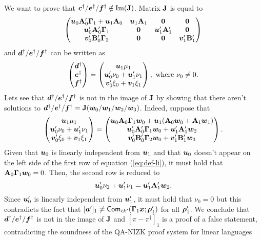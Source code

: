 We want to prove that ${\boldsymbol{c}}^\dag/{\boldsymbol{e}}^\dag/{\boldsymbol{f}}^\dag\notin\mathrm{Im}(\mathbf{{J}})$. Matrix $\mathbf{{J}}$ is equal to
$$
\begin{pmatrix}
{\boldsymbol{u}}_{0}\mathbf{{A}}'_0\mathbf{{\Gamma}}_1 + {\boldsymbol{u}}_1\mathbf{{A}}_0 & {\boldsymbol{u}}_{1}\mathbf{{A}}_1 & \mathbf{{0}} & \mathbf{{0}} \\
{\boldsymbol{u}}'_0\mathbf{{A}}'_0\mathbf{{\Gamma}}_1  & \mathbf{{0}} & {\boldsymbol{u}}'_1\mathbf{{A}}'_1 & \mathbf{{0}} \\
{\boldsymbol{v}}'_0\mathbf{{B}}'_0\mathbf{{\Gamma}}_2  & \mathbf{{0}} & \mathbf{{0}} & {\boldsymbol{v}}'_1\mathbf{{B}}'_1
\end{pmatrix}
$$
and ${\boldsymbol{d}}^\dag/{\boldsymbol{e}}^\dag/{\boldsymbol{f}}^\dag$ can be written as
$$
\begin{pmatrix} {\boldsymbol{d}}^\dag\\ {\boldsymbol{e}}^\dag \\ {\boldsymbol{f}}^\dag\end{pmatrix}
=
\begin{pmatrix}
{\boldsymbol{u}}_{1}\mu_{1} \\
{\boldsymbol{u}}'_{0}\nu_{0} + {\boldsymbol{u}}'_1\nu_1\\
{\boldsymbol{v}}'_0\xi_0 + {\boldsymbol{v}}_1\xi_1
\end{pmatrix},
\text{ where } \nu_0 \neq 0.
$$
Lets see that ${\boldsymbol{d}}^\dag/{\boldsymbol{e}}^\dag/{\boldsymbol{f}}^\dag$ is not in the image of $\mathbf{{J}}$ by showing that there aren't solutions to ${\boldsymbol{d}}^\dag/{\boldsymbol{e}}^\dag/{\boldsymbol{f}}^\dag=\mathbf{{J}}({\boldsymbol{w}}_{0}/{\boldsymbol{w}}_{1}/{\boldsymbol{w}}_{2}/{\boldsymbol{w}}_{3})$. Indeed, suppose that
\begin{align}
\begin{pmatrix}
{\boldsymbol{u}}_{1}\mu_{1} \\
{\boldsymbol{u}}'_{0}\nu_{0} + {\boldsymbol{u}}'_1\nu_1\\
{\boldsymbol{v}}'_0\xi_0 + {\boldsymbol{v}}_1\xi_1
\end{pmatrix}
=
\begin{pmatrix}
{\boldsymbol{u}}_0\mathbf{{A}}_0\mathbf{{\Gamma}}_1{\boldsymbol{w}}_0 + {\boldsymbol{u}}_1(\mathbf{{A}}_0{\boldsymbol{w}}_0 + \mathbf{{A}}_1{\boldsymbol{w}}_1)\\
{\boldsymbol{u}}'_0\mathbf{{A}}'_0\mathbf{{\Gamma}}_1{\boldsymbol{w}}_0 + {\boldsymbol{u}}'_1\mathbf{{A}}'_1{\boldsymbol{w}}_{2}\\
{\boldsymbol{v}}'_0\mathbf{{B}}'_0\mathbf{{\Gamma}}_2{\boldsymbol{w}}_0 + {\boldsymbol{v}}'_1\mathbf{{B}}'_1{\boldsymbol{w}}_{3}
\end{pmatrix}.
\label{eq:def-li}
\end{align}
Given that ${\boldsymbol{u}}_{0}$ is linearly independent from ${\boldsymbol{u}}_{1}$ and that ${\boldsymbol{u}}_{0}$ doesn't appear on the left side of the first row of equation (\ref{eq:def-li}), it must hold that $\mathbf{{A}}_0\mathbf{{\Gamma}}_1{\boldsymbol{w}}_{0}=0$. Then, the second row is reduced to
$$
{\boldsymbol{u}}'_{0}\nu_{0} + {\boldsymbol{u}}'_1\nu_1 = {\boldsymbol{u}}'_1\mathbf{{A}}'_1{\boldsymbol{w}}_{2}.
$$
Since ${\boldsymbol{u}}'_0$ is linearly independent from ${\boldsymbol{u}}'_1$, it must hold that $\nu_0=0$ but this contradicts the fact that $[{\boldsymbol{a}}']_1\neq\mathsf{Com}_{ck'}(\mathbf{{\Gamma}}_1{\boldsymbol{x}};{\boldsymbol{\rho}}'_1)$ for all ${\boldsymbol{\rho}}'_1$. We conclude that ${\boldsymbol{d}}^\dag/{\boldsymbol{e}}^\dag/{\boldsymbol{f}}^\dag$ is not in the image of $\mathbf{{J}}$ and $[\pi-\pi^\dag]_1$ is a proof of a false statement, contradicting the soundness of the QA-NIZK proof system for linear languages

